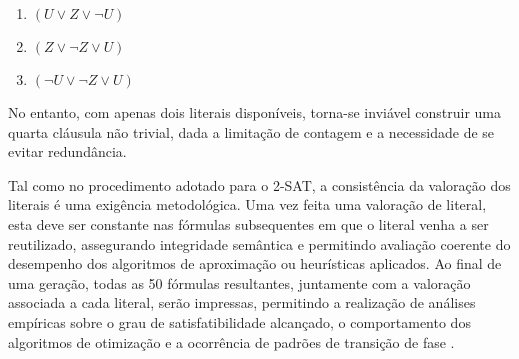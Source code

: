 \begin{enumerate}
    \item $(U \lor Z \lor \lnot U)$
    \item $(Z \lor \lnot Z \lor U)$
    \item $(\lnot U \lor \lnot Z \lor U)$
\end{enumerate}

No entanto, com apenas dois literais disponíveis, torna-se inviável construir uma quarta cláusula não trivial, dada a limitação de contagem e a necessidade de se evitar redundância.

Tal como no procedimento adotado para o 2-SAT, a consistência da valoração dos literais é uma exigência metodológica. Uma vez feita uma valoração de literal, esta deve ser constante nas fórmulas subsequentes em que o literal venha a ser reutilizado, assegurando integridade semântica e permitindo avaliação coerente do desempenho dos algoritmos de aproximação ou heurísticas aplicados. Ao final de uma geração, todas as 50 fórmulas resultantes, juntamente com a valoração associada a cada literal, serão impressas, permitindo a realização de análises empíricas sobre o grau de satisfatibilidade alcançado, o comportamento dos algoritmos de otimização e a ocorrência de padrões de transição de fase \cite{monasson1999determining}.